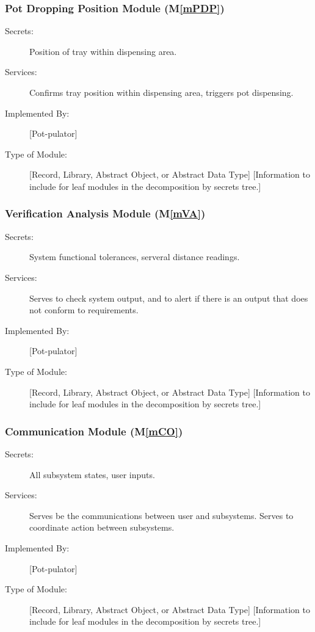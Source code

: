 \documentclass[12pt, titlepage]{article}
\newcommand{\mref}[1]{M\ref{#1}}
\begin{document}
\subsubsection{Pot Dropping Position Module (\mref{mPDP})}
\begin{description}
\item[Secrets:] Position of tray within dispensing area.
\item[Services:] Confirms tray position within dispensing area, triggers pot dispensing.
\item[Implemented By:] [Pot-pulator]
\item[Type of Module:] [Record, Library, Abstract Object, or Abstract Data Type]
  [Information to include for leaf modules in the decomposition by secrets tree.]
\end{description}

\subsubsection{Verification Analysis Module (\mref{mVA})}
\begin{description}
\item[Secrets:] System functional tolerances,  serveral distance readings.
\item[Services:] Serves to check system output, and to alert if there is an output that does not conform to requirements.
\item[Implemented By:] [Pot-pulator]
\item[Type of Module:] [Record, Library, Abstract Object, or Abstract Data Type]
  [Information to include for leaf modules in the decomposition by secrets tree.]
\end{description}

\subsubsection{Communication Module (\mref{mCO})}
\begin{description}
\item[Secrets:] All subsystem states, user inputs.
\item[Services:] Serves be the communications between user and subsystems. Serves to coordinate action between subsystems.
\item[Implemented By:] [Pot-pulator]
\item[Type of Module:] [Record, Library, Abstract Object, or Abstract Data Type]
  [Information to include for leaf modules in the decomposition by secrets tree.]
\end{description}
\end{document}
